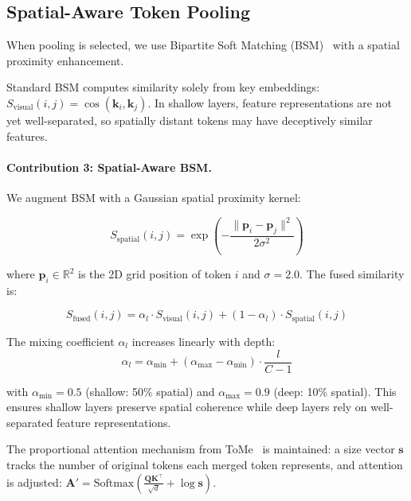 \documentclass[10pt,twocolumn,letterpaper]{article}
\begin{document}
\subsection{Spatial-Aware Token Pooling}
\label{sec:spatial}

When pooling is selected, we use Bipartite Soft Matching (BSM)~\cite{bolya2023tome}
with a spatial proximity enhancement.

Standard BSM computes similarity solely from key embeddings:
$S_{\text{visual}}(i,j) = \cos(\mathbf{k}_i, \mathbf{k}_j)$. In shallow layers,
feature representations are not yet well-separated, so spatially distant tokens
may have deceptively similar features.

\paragraph{Contribution 3: Spatial-Aware BSM.}
We augment BSM with a Gaussian spatial proximity kernel:

\begin{equation}
\label{eq:spatial_kernel}
S_{\text{spatial}}(i,j) = \exp\!\left(-\frac{\|\mathbf{p}_i - \mathbf{p}_j\|^2}{2\sigma^2}\right)
\end{equation}

where $\mathbf{p}_i \in \mathbb{R}^2$ is the 2D grid position of token $i$
and $\sigma = 2.0$. The fused similarity is:

\begin{equation}
\label{eq:fused_sim}
S_{\text{fused}}(i,j) = \alpha_l \cdot S_{\text{visual}}(i,j) + (1 - \alpha_l) \cdot S_{\text{spatial}}(i,j)
\end{equation}

The mixing coefficient $\alpha_l$ increases linearly with depth:
\begin{equation}
\label{eq:alpha_schedule}
\alpha_l = \alpha_{\min} + (\alpha_{\max} - \alpha_{\min}) \cdot \frac{l}{C-1}
\end{equation}

with $\alpha_{\min} = 0.5$ (shallow: 50\% spatial) and $\alpha_{\max} = 0.9$
(deep: 10\% spatial). This ensures shallow layers preserve spatial coherence
while deep layers rely on well-separated feature representations.

The proportional attention mechanism from ToMe~\cite{bolya2023tome} is
maintained: a size vector $\mathbf{s}$ tracks the number of original tokens
each merged token represents, and attention is adjusted:
$\mathbf{A}' = \text{Softmax}\!\left(\frac{\mathbf{Q}\mathbf{K}^\top}{\sqrt{d}} + \log \mathbf{s}\right)$.
\end{document}
